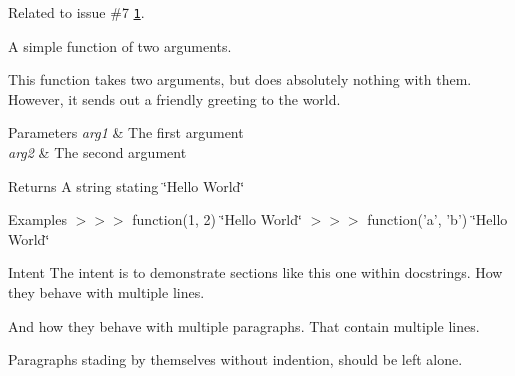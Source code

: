 Related to issue \#7 \href{https://github.com/Feneric/doxypypy/issues/7}{\tt 1}.

A simple function of two arguments. \begin{DoxyVerb}This function takes two arguments, but does absolutely nothing with them.
However, it sends out a friendly greeting to the world.
\end{DoxyVerb}



\begin{DoxyParams}{Parameters}
{\em arg1} & The first argument \\
\hline
{\em arg2} & The second argument\\
\hline
\end{DoxyParams}
\begin{DoxyReturn}{Returns}
A string stating \char`\"{}\-Hello World\char`\"{}
\end{DoxyReturn}
\begin{DoxyParagraph}{Examples}
$>$$>$$>$ function(1, 2) \char`\"{}\-Hello World\char`\"{} $>$$>$$>$ function('a', 'b') \char`\"{}\-Hello World\char`\"{}
\end{DoxyParagraph}
\begin{DoxyParagraph}{Intent}
The intent is to demonstrate sections like this one within docstrings. How they behave with multiple lines. 
\end{DoxyParagraph}
\begin{DoxyParagraph}{}
And how they behave with multiple paragraphs. That contain multiple lines.
\end{DoxyParagraph}
Paragraphs stading by themselves without indention, should be left alone. 